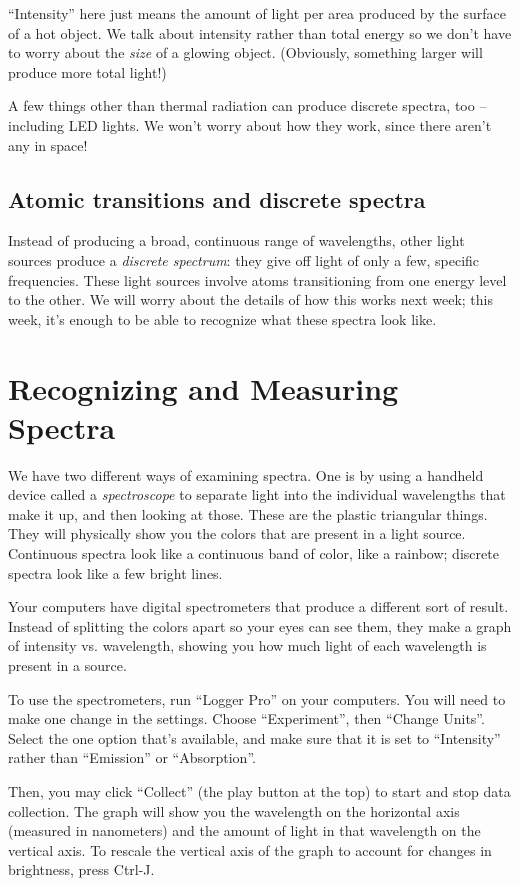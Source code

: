\documentclass[11pt]{article}
\begin{document}
``Intensity'' here just means the amount of light per area produced by the surface of a hot object. We talk about intensity rather than total energy so we don't have to worry about the {\it size} of a glowing object. (Obviously, something larger will produce more total light!)

A few things other than thermal radiation can produce discrete spectra, too -- including LED lights. We won't worry about how they work, since there aren't any in space!

\subsection{Atomic transitions and discrete spectra}

Instead of producing a broad, continuous range of wavelengths, other light sources produce a {\it discrete spectrum}: they give off light
of only a few, specific frequencies. These light sources involve atoms transitioning from one energy level to the other. We will worry about the details of how this works next week; this week, it's enough to be able to recognize what these spectra look like.

\section{Recognizing and Measuring Spectra}

We have two different ways of examining spectra. One is by using a handheld device called a {\it spectroscope} to separate light into the individual wavelengths that make it up, and then looking at those. These are the plastic triangular things. They will physically show you 
the colors that are present in a light source. Continuous spectra look like a continuous band of color, like a rainbow; discrete spectra look like a few bright lines.

Your computers have digital spectrometers that produce a different sort of result. Instead of splitting the colors apart so your eyes can see them, they make a graph of intensity vs. wavelength, showing you how much light of each wavelength is present in a source.

To use the spectrometers, run ``Logger Pro'' on your computers. You will need to make one change in the settings. Choose ``Experiment'', then ``Change Units''. Select the one option that's available, and make sure that it is set to ``Intensity'' rather than ``Emission'' or ``Absorption''.

Then, you may click ``Collect'' (the play button at the top) to start and stop data collection. The graph will show you the wavelength on the horizontal axis (measured in nanometers) and the amount of light in that wavelength on the vertical axis. To rescale the vertical axis of the graph to account for changes in brightness, press Ctrl-J.
\end{document}
